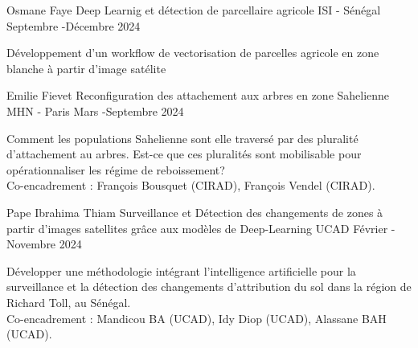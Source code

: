 \vspace{2em}
\vspace{1em}
\begin{cventries}
  \cventry
      {Osmane Faye} %
      {Deep Learnig et détection de parcellaire agricole} %
      {ISI - Sénégal} %
      {Septembre -Décembre 2024} %
      {
      \begin{cvitems} %
        Développement d'un workflow de vectorisation de parcelles agricole en zone blanche à partir d'image satélite\\
      \end{cvitems}
      }
  \cventry
      {Emilie Fievet} %
      {Reconfiguration des attachement aux arbres en zone Sahelienne} %
      {MHN - Paris} %
      {Mars -Septembre 2024} %
      {
      \begin{cvitems} %
        Comment les populations Sahelienne sont elle traversé par des pluralité d'attachement au arbres. Est-ce que ces pluralités sont mobilisable pour opérationnaliser les régime de reboissement?\\
          Co-encadrement : François Bousquet (CIRAD), François Vendel (CIRAD).
      \end{cvitems}
      }

    \cventry
        {Pape Ibrahima Thiam} %
        {Surveillance et Détection des changements de zones à partir d’images satellites grâce aux modèles de Deep-Learning} %
        {UCAD } %
        {Février - Novembre 2024} %
        {
        \begin{cvitems} %
          Développer une méthodologie intégrant l’intelligence artificielle pour la surveillance et la détection des changements d'attribution du sol dans la région de Richard Toll, au Sénégal.\\
            Co-encadrement : Mandicou BA (UCAD), Idy Diop (UCAD), Alassane BAH (UCAD).
        \end{cvitems}
        }



\end{cventries}
